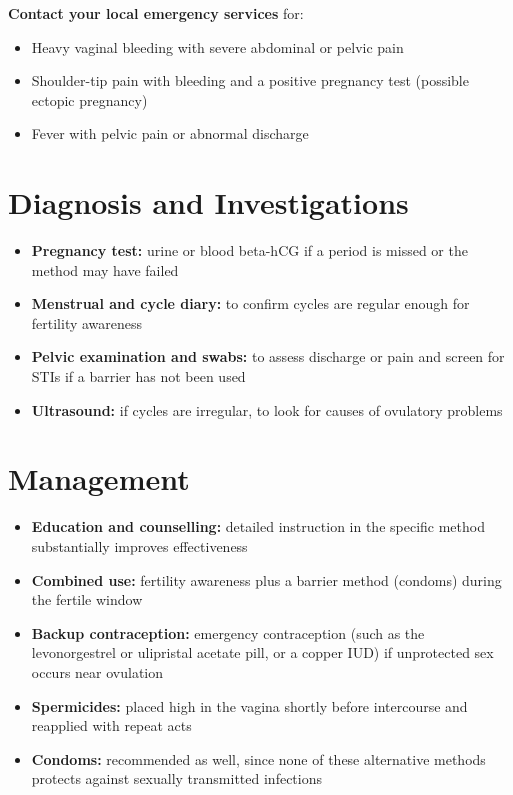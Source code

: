 \textbf{Contact your local emergency services} for:
\begin{itemize}
    \item Heavy vaginal bleeding with severe abdominal or pelvic pain
    \item Shoulder-tip pain with bleeding and a positive pregnancy test (possible ectopic pregnancy)
    \item Fever with pelvic pain or abnormal discharge
\end{itemize}

\section*{Diagnosis and Investigations}
\begin{itemize}
    \item \textbf{Pregnancy test:} urine or blood beta-hCG if a period is missed or the method may have failed
    \item \textbf{Menstrual and cycle diary:} to confirm cycles are regular enough for fertility awareness
    \item \textbf{Pelvic examination and swabs:} to assess discharge or pain and screen for STIs if a barrier has not been used
    \item \textbf{Ultrasound:} if cycles are irregular, to look for causes of ovulatory problems
\end{itemize}

\section*{Management}
\begin{itemize}
    \item \textbf{Education and counselling:} detailed instruction in the specific method substantially improves effectiveness
    \item \textbf{Combined use:} fertility awareness plus a barrier method (condoms) during the fertile window
    \item \textbf{Backup contraception:} emergency contraception (such as the levonorgestrel or ulipristal acetate pill, or a copper IUD) if unprotected sex occurs near ovulation
    \item \textbf{Spermicides:} placed high in the vagina shortly before intercourse and reapplied with repeat acts
    \item \textbf{Condoms:} recommended as well, since none of these alternative methods protects against sexually transmitted infections
\end{itemize}


